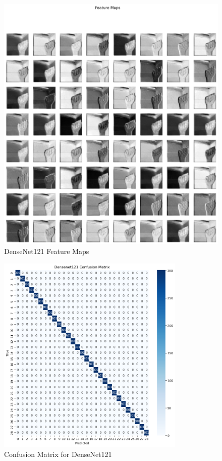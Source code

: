 \documentclass[12pt, a4paper]{article}
\begin{document}
\begin{figure}[H]
    \centering
    \includegraphics[width=\textwidth]{../../plots/DenseNet121_Visualize.png}
    \caption{DenseNet121 Feature Maps}
    \label{fig:densenet121_visualize}
\end{figure}
\begin{figure}[H]
    \centering
    \includegraphics[width=0.8\textwidth]{../../plots/DenseNet121_ConfusionMatrix.png}
    \caption{Confusion Matrix for DenseNet121}
    \label{fig:densenet121_confusion_matrix}
\end{figure}
\end{document}
